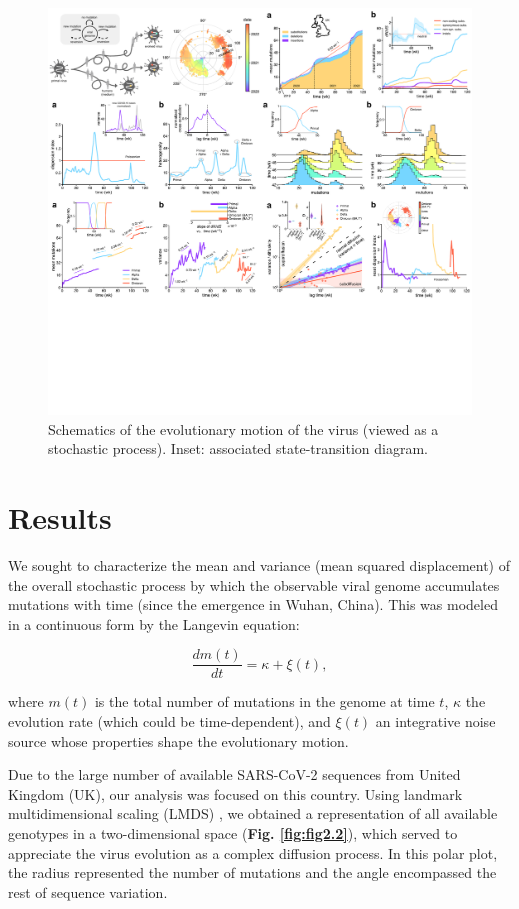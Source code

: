 \begin{figure}[ht!]
    \centering
    \includegraphics[trim={0 37.5cm 36.5cm 0.5cm},clip, width=0.67\linewidth]{assets/Ch2Fig.pdf}
    \caption{Schematics of the evolutionary motion of the virus (viewed as a stochastic process). Inset: associated state-transition diagram.}\label{fig:fig2.1}
\end{figure}
\vfill
\section{Results}\label{sec:results}

We sought to characterize the mean and variance (mean squared displacement) of the overall stochastic process by which the observable viral genome accumulates mutations with time (since the emergence in Wuhan, China). This was modeled in a continuous form by the Langevin equation:

\begin{equation}
    \frac{dm(t)}{dt}=\kappa + \xi(t)\label{eq:solution-model},
\end{equation}

\noindent where $m(t)$ is the total number of mutations in the genome at time $t$, $\kappa$ the evolution rate (which could be time-dependent), and $\xi(t)$ an integrative noise source whose properties shape the evolutionary motion.

Due to the large number of available SARS-CoV-2 sequences from United Kingdom (UK), our analysis was focused on this country. Using landmark multidimensional scaling (LMDS) \cite{deSilva2003}, we obtained a representation of all available genotypes in a two-dimensional space (\textbf{Fig. \ref{fig:fig2.2}}), which served to appreciate the virus evolution as a complex diffusion process. In this polar plot, the radius represented the number of mutations and the angle encompassed the rest of sequence variation.

